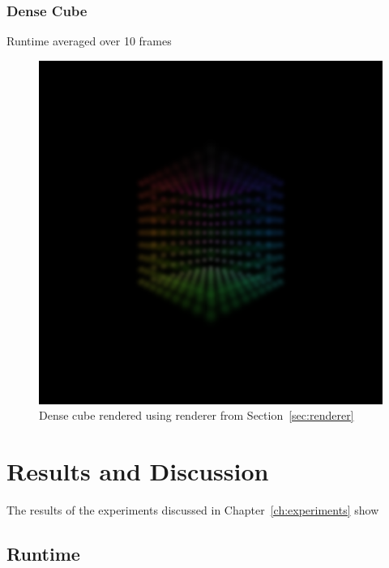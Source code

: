 \documentclass[a4paper, 11pt]{memoir}
\begin{document}

    \subsection{Dense Cube}
    \label{sec:dense_cube}
    Runtime averaged over 10 frames
    \begin{figure}[t]
        \centering
        \includegraphics[scale=.2]{images/cube.png}
        \caption{Dense cube rendered using renderer from Section~\ref{sec:renderer}}
        \label{fig:cube_render}
    \end{figure}
    
    \chapter{Results and Discussion}

    The results of the experiments discussed in Chapter~\ref{ch:experiments} show

    \section{Runtime}
\end{document}
